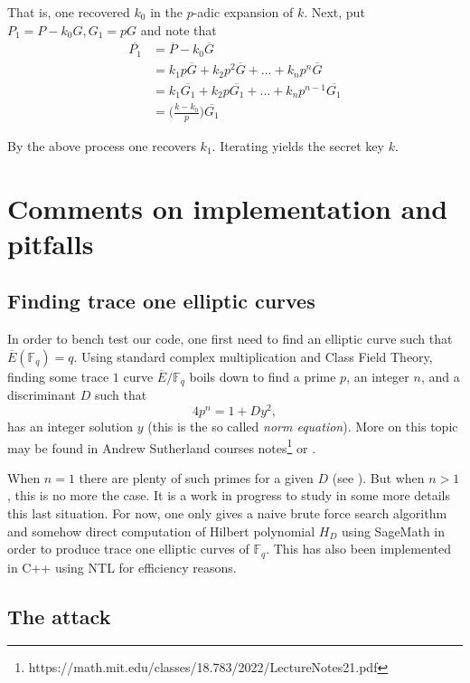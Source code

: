 \documentclass[10pt]{article}
\theoremstyle{definition}
\newcommand{\F}{\mathbb{F}}
\begin{document}
\noindent That is, one recovered $k_0$ in the $p$-adic expansion of $k$.	
Next, put $P_1 = P - k_0G, G_1 = pG$ and note that
\begin{align*}
\overline{P_1} &=  \overline{P} - k_0 \overline{G}  \\
               &=  k_1p\overline{G} + k_2p^2\overline{G} + \dots + k_np^n \overline{G}\\
               &=  k_1\overline{G_1} + k_2p\overline{G_1} + \dots + k_np^{n-1} \overline{G_1}\\
               &= \Big(\frac{k-k_0}{p}\Big)\overline{G_1}
\end{align*}

\noindent By the above process one recovers $k_1$.
Iterating yields the secret key $k$.


\section{Comments on implementation and pitfalls}


\subsection{Finding trace one elliptic curves}


In order to bench test our code, one first need to find an elliptic curve such that $\overline{E}(\F_q) = q$.
Using standard complex multiplication and Class Field Theory, finding some trace $1$ curve $\overline{E} /\F_q$ boils down to find a prime $p$, an integer $n$, and a discriminant $D$ such that 
\[ 4p^n = 1 + Dy^2, \]
has an integer solution $y$ (this is the so called \textsl{norm equation}).
More on this topic may be found in Andrew Sutherland courses notes\footnote{https://math.mit.edu/classes/18.783/2022/LectureNotes21.pdf} or \cite{Cox}. 

When $n =1$ there are plenty of such primes for a given $D$ (see \cite{LEPREVOST2005225}).
But when $n > 1$, this is no more the case. 
It is a work in progress to study in some more details this last situation.
For now, one only gives a naive brute force search algorithm and somehow direct computation of Hilbert polynomial $H_D$ using SageMath in order to produce trace one elliptic curves of $\F_q$.
This has also been implemented in C++ using NTL for efficiency reasons.
\subsection{The attack}
\end{document}
